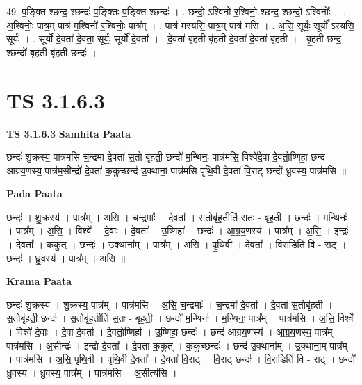 \documentclass[17pt]{extarticle}
\begin{document}
49. प॒ङ्क्ति श्छन्द॒ श्छन्दः॑ प॒ङ्क्तिः प॒ङ्क्ति श्छन्दः॑ । . छन्दो॒ ऽश्विनो॑ र॒श्विनो॒ श्छन्द॒ श्छन्दो॒ ऽश्विनोः᳚ । . अ॒श्विनोः॒ पात्र॒म् पात्र॑ म॒श्विनो॑ र॒श्विनोः॒ पात्र᳚म् । . पात्र॑ मस्यसि॒ पात्र॒म् पात्र॑ मसि । . अ॒सि॒ सूर्यः॒ सूर्यो᳚ ऽस्यसि॒ सूर्यः॑ । . सूर्यो॑ दे॒वता॑ दे॒वता॒ सूर्यः॒ सूर्यो॑ दे॒वता᳚ । . दे॒वता॑ बृह॒ती बृ॑ह॒ती दे॒वता॑ दे॒वता॑ बृह॒ती । . बृ॒ह॒ती छन्द॒ श्छन्दो॑ बृह॒ती बृ॑ह॒ती छन्दः॑ । \newline
\pagebreak
{}

\section{ TS 3.1.6.3 }

\textbf{TS 3.1.6.3 } \newline
\textbf{Samhita Paata} \newline

छन्दः॑ शु॒क्रस्य॒ पात्र॑मसि च॒न्द्रमा॑ दे॒वता॑ स॒तो बृ॑हती॒ छन्दो॑ म॒न्थिनः॒ पात्र॑मसि॒ विश्वे॑दे॒वा दे॒वतो॒ष्णिहा॒ छन्द॑ आग्रय॒णस्य॒ पात्र॑म॒सीन्द्रो॑ दे॒वता॑ क॒कुच्छन्द॑ उ॒क्थानां॒ पात्र॑मसि पृथि॒वी दे॒वता॑ वि॒राट् छन्दो᳚ ध्रु॒वस्य॒ पात्र॑मसि ॥ \newline

\textbf{Pada Paata} \newline

छन्दः॑ । शु॒क्रस्य॑ । पात्र᳚म् । अ॒सि॒ । च॒न्द्रमाः᳚ । दे॒वता᳚ । स॒तोबृ॑ह॒तीति॑ स॒तः - बृ॒ह॒ती॒ । छन्दः॑ । म॒न्थिनः॑ । पात्र᳚म् । अ॒सि॒ । विश्वे᳚ । दे॒वाः । दे॒वता᳚ । उ॒ष्णिहा᳚ । छन्दः॑ । आ॒ग्र॒य॒णस्य॑ । पात्र᳚म् । अ॒सि॒ । इन्द्रः॑ । दे॒वता᳚ । क॒कुत् । छन्दः॑ । उ॒क्थाना᳚म् । पात्र᳚म् । अ॒सि॒ । पृ॒थि॒वी । दे॒वता᳚ । वि॒राडिति॑ वि - राट् । छन्दः॑ । ध्रु॒वस्य॑ । पात्र᳚म् । अ॒सि॒ ॥  \newline


\textbf{Krama Paata} \newline

छन्दः॑ शु॒क्रस्य॑ । शु॒क्रस्य॒ पात्र᳚म् । पात्र॑मसि । अ॒सि॒ च॒न्द्रमाः᳚ । च॒न्द्रमा॑ दे॒वता᳚ । दे॒वता॑ स॒तोबृ॑हती । स॒तोबृ॑हती॒ छन्दः॑ । स॒तोबृ॑ह॒तीति॑ स॒तः - बृ॒ह॒ती॒ । छन्दो॑ म॒न्थिनः॑ । म॒न्थिनः॒ पात्र᳚म् । पात्र॑मसि । अ॒सि॒ विश्वे᳚ । विश्वे॑ दे॒वाः । दे॒वा दे॒वता᳚ । दे॒वतो॒ष्णिहा᳚ । उ॒ष्णिहा॒ छन्दः॑ । छन्द॑ आग्रय॒णस्य॑ । आ॒ग्र॒य॒णस्य॒ पात्र᳚म् । पात्र॑मसि । अ॒सीन्द्रः॑ । इन्द्रो॑ दे॒वता᳚ । दे॒वता॑ क॒कुत् । क॒कुच्छन्दः॑ । छन्द॑ उ॒क्थाना᳚म् । उ॒क्थाना॒म् पात्र᳚म् । पात्र॑मसि । अ॒सि॒ पृ॒थि॒वी । पृ॒थि॒वी दे॒वता᳚ । दे॒वता॑ वि॒राट् । वि॒राट् छन्दः॑ । वि॒राडिति॑ वि - राट् । छन्दो᳚ ध्रु॒वस्य॑ । ध्रु॒वस्य॒ पात्र᳚म् । पात्र॑मसि । अ॒सीत्य॑सि । \newline
\end{document}
